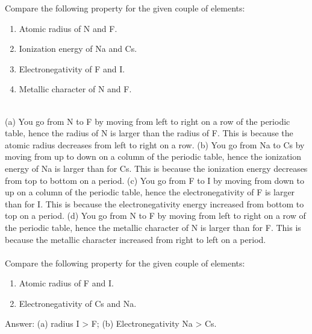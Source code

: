 \documentclass[main.tex]{subfiles}
\begin{document}
\begin{description}
\begin{example} %
Compare the following property for the given couple of elements:
\begin{enumerate}[label=(\alph*)]
\item Atomic radius of N and F.
\item Ionization energy of Na and Cs.
\item Electronegativity of F and I.
\item Metallic character of N and F. 
\end{enumerate}
\\
(a) You go from N to F by moving from left to right on a row of the periodic table, hence the radius of N is larger than the radius of F. This is because the atomic radius decreases from left to right on a row.
(b) You go from Na to Cs by moving from up to down on a column of the periodic table, hence the ionization energy of Na is larger than for Cs. This is because the ionization energy decreases from top to bottom on a period.
(c) You go from F to I by moving from down to up on a column of the periodic table, hence the electronegativity of F is larger than for I. This is because the electronegativity energy increased from bottom to top on a period.
(d) You go from N to F by moving from left to right on a row of the periodic table, hence the metallic character of N is larger than for F. This is because the metallic character increased from right to left on a period.
\\
\faDiamond\ \\
Compare the following property for the given couple of elements:
\begin{enumerate}[label=(\alph*)]
\item Atomic radius of F and I.
\item Electronegativity of Cs and Na.
\end{enumerate}
\flushright Answer: (a) radius I > F; (b) Electronegativity Na > Cs.
\end{example}%


  
  

\end{description}
\end{document}
